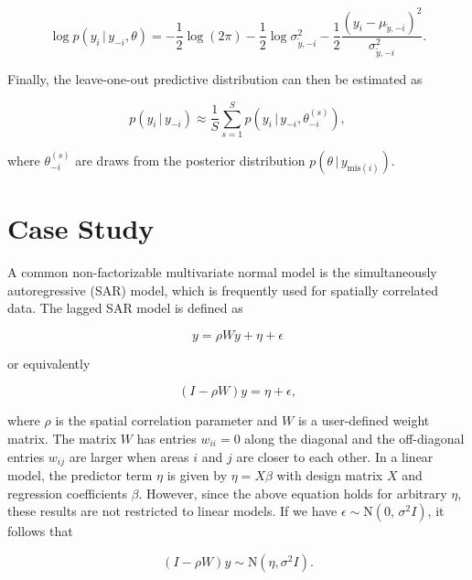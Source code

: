 \documentclass[english,,doc,floatsintext]{apa6}
\theoremstyle{definition}
\theoremstyle{definition}
\theoremstyle{definition}
\theoremstyle{remark}
\begin{document}
\begin{equation}
  \log p(y_i\,|\,y_{-i},\theta)
  = - \frac{1}{2}\log(2\pi)
  - \frac{1}{2}\log \sigma^2_{\tilde{y},-i}
  - \frac{1}{2}\frac{(y_i-\mu_{\tilde{y},-i})^2}{\sigma^2_{\tilde{y},-i}}.
\end{equation}

Finally, the leave-one-out predictive distribution can then be estimated
as

\begin{equation}
 p(y_i\,|\,y_{-i}) \approx \frac{1}{S} \sum_{s=1}^S p(y_i\,|\,y_{-i}, \theta_{-i}^{(s)}),
\end{equation}

where \(\theta_{-i}^{(s)}\) are draws from the posterior distribution
\(p(\theta\,|\,y_{\mathrm{mis}(i)})\).

\hypertarget{case-study}{%
\section{Case Study}\label{case-study}}

A common non-factorizable multivariate normal model is the
simultaneously autoregressive (SAR) model, which is frequently used for
spatially correlated data. The lagged SAR model is defined as

\begin{equation}
y = \rho Wy + \eta + \epsilon
\end{equation}

or equivalently

\begin{equation}
(I - \rho W)y = \eta + \epsilon,
\end{equation}

where \(\rho\) is the spatial correlation parameter and \(W\) is a
user-defined weight matrix. The matrix \(W\) has entries \(w_{ii} = 0\)
along the diagonal and the off-diagonal entries \(w_{ij}\) are larger
when areas \(i\) and \(j\) are closer to each other. In a linear model,
the predictor term \(\eta\) is given by \(\eta = X \beta\) with design
matrix \(X\) and regression coefficients \(\beta\). However, since the
above equation holds for arbitrary \(\eta\), these results are not
restricted to linear models. If we have
\(\epsilon \sim {\mathrm N}(0, \,\sigma^2 I)\), it follows that

\begin{equation}
(I - \rho W)y \sim {\mathrm N}(\eta, \sigma^2 I).
\end{equation}
\end{document}
